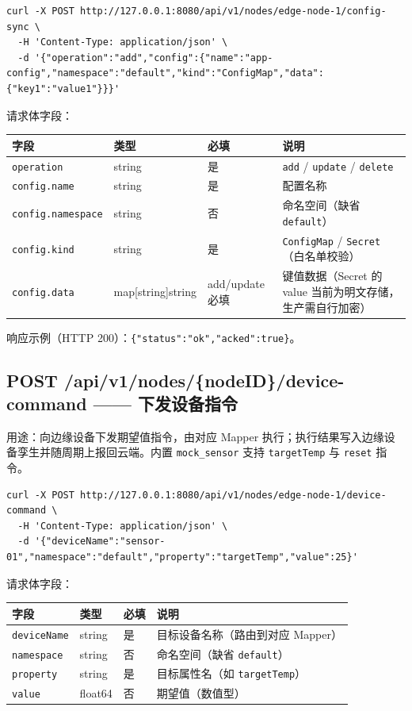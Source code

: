 \begin{lstlisting}
curl -X POST http://127.0.0.1:8080/api/v1/nodes/edge-node-1/config-sync \
  -H 'Content-Type: application/json' \
  -d '{"operation":"add","config":{"name":"app-config","namespace":"default","kind":"ConfigMap","data":{"key1":"value1"}}}'
\end{lstlisting}

请求体字段：

\begin{tabularx}{\textwidth}{l l l X}
  \toprule
  \textbf{字段} & \textbf{类型} & \textbf{必填} & \textbf{说明} \\
  \midrule
  \texttt{operation} & string & 是 & \texttt{add} / \texttt{update} / \texttt{delete} \\
  \texttt{config.name} & string & 是 & 配置名称 \\
  \texttt{config.namespace} & string & 否 & 命名空间（缺省 \texttt{default}） \\
  \texttt{config.kind} & string & 是 & \texttt{ConfigMap} / \texttt{Secret}（白名单校验） \\
  \texttt{config.data} & map[string]string & add/update 必填 & 键值数据（Secret 的 value 当前为明文存储，生产需自行加密） \\
  \bottomrule
\end{tabularx}

响应示例（HTTP 200）：\texttt{\{"status":"ok","acked":true\}}。

\subsection{POST /api/v1/nodes/\{nodeID\}/device-command —— 下发设备指令}

用途：向边缘设备下发期望值指令，由对应 Mapper 执行；执行结果写入边缘设备孪生并随周期上报回云端。内置 \texttt{mock\_sensor} 支持 \texttt{targetTemp} 与 \texttt{reset} 指令。

\begin{lstlisting}
curl -X POST http://127.0.0.1:8080/api/v1/nodes/edge-node-1/device-command \
  -H 'Content-Type: application/json' \
  -d '{"deviceName":"sensor-01","namespace":"default","property":"targetTemp","value":25}'
\end{lstlisting}

请求体字段：

\begin{tabularx}{\textwidth}{l l l X}
  \toprule
  \textbf{字段} & \textbf{类型} & \textbf{必填} & \textbf{说明} \\
  \midrule
  \texttt{deviceName} & string & 是 & 目标设备名称（路由到对应 Mapper） \\
  \texttt{namespace} & string & 否 & 命名空间（缺省 \texttt{default}） \\
  \texttt{property} & string & 是 & 目标属性名（如 \texttt{targetTemp}） \\
  \texttt{value} & float64 & 否 & 期望值（数值型） \\
  \bottomrule
\end{tabularx}

